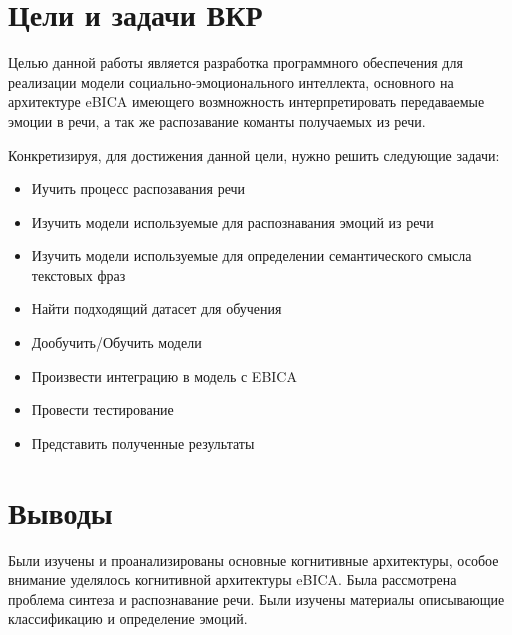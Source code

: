 \section{Цели и задачи ВКР}

Целью данной работы является разработка программного обеспечения для реализации
модели социально-эмоционального интеллекта, основного на архитектуре eBICA
имеющего возмножность интерпретировать передаваемые эмоции в речи, а так 
же распозавание команты получаемых из речи.

Конкретизируя, для достижения данной цели, нужно решить следующие задачи:
\begin{itemize}
	\item Иучить процесс распозавания речи
	\item Изучить модели используемые для распознавания эмоций из речи
	\item Изучить модели используемые для определении семантического смысла текстовых фраз
	\item Найти подходящий датасет для обучения
	\item Дообучить/Обучить модели 
	\item Произвести интеграцию в модель с EBICA 
	\item Провести тестирование
	\item Представить полученные результаты
\end{itemize}

\section{Выводы}

Были изучены и проанализированы основные когнитивные архитектуры, особое внимание уделялось когнитивной архитектуры eBICA.
Была рассмотрена проблема синтеза и распознавание речи. Были изучены материалы описывающие классификацию и определение эмоций.
